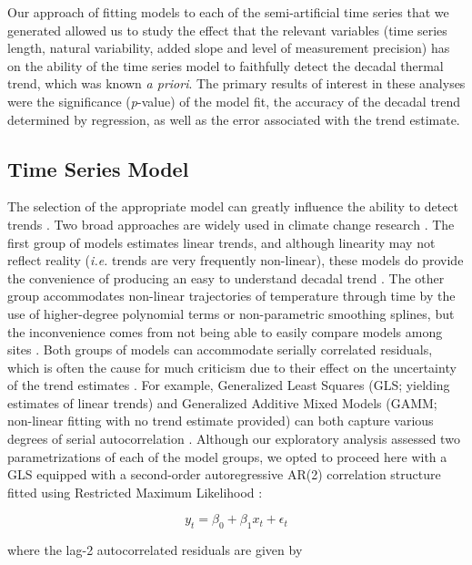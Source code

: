 \documentclass[]{ametsoc}
\begin{document}
Our approach of fitting models to each of the semi-artificial time series that we generated allowed us to study the effect that the relevant variables (time series length, natural variability, added slope and level of measurement precision) has on the ability of the time series model to faithfully detect the decadal thermal trend, which was known \emph{a priori}. The primary results of interest in these analyses were the significance (\emph{p}-value) of the model fit, the accuracy of the decadal trend determined by regression, as well as the error associated with the trend estimate.

\subsection{Time Series Model}
The selection of the appropriate model can greatly influence the ability to detect trends \citep{Franzke2012}. Two broad approaches are widely used in climate change research \citep{IPCC2013}. The first group of models estimates linear trends, and although linearity may not reflect reality (\emph{i.e.} trends are very frequently non-linear), these models do provide the convenience of producing an easy to understand decadal trend \citep[\emph{e.g.} \SI{0.106}{\degreeCelsius}~dec$^{-1}$;][]{Wilks2011,IPCC2013}. The other group accommodates non-linear trajectories of temperature through time by the use of higher-degree polynomial terms or non-parametric smoothing splines, but the inconvenience comes from not being able to easily compare models among sites \citep{Wood2006,Scinocca2010}. Both groups of models can accommodate serially correlated residuals, which is often the cause for much criticism due to their effect on the uncertainty of the trend estimates \citep{vonStorch1999,Santer2008}. For example, Generalized Least Squares (GLS; yielding estimates of linear trends) and Generalized Additive Mixed Models (GAMM; non-linear fitting with no trend estimate provided) can both capture various degrees of serial autocorrelation \citep{pinheiro2006mixed,Wood2006}. Although our exploratory analysis assessed two parametrizations of each of the model groups, we opted to proceed here with a GLS equipped with a second-order autoregressive AR(2) correlation structure fitted using Restricted Maximum Likelihood \citep[REML;][]{pinheiro2006mixed}:

$$y_{t} = \beta_{0} + \beta_{1}x_{t} + \epsilon_{t}$$

where the lag-2 autocorrelated residuals are given by
\end{document}
